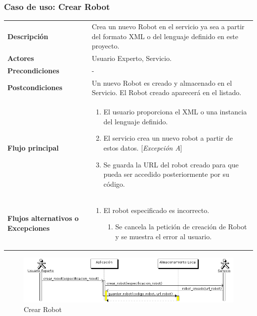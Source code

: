\subsubsection{\large{Caso de uso: Crear Robot}}

\begin{tabular}[h]{ p{ } p{ }}

\textbf{Descripción} & Crea un nuevo Robot en el servicio ya sea a
partir del formato XML o del lenguaje definido en este
proyecto.\\[3mm]

\textbf{Actores} & Usuario Experto, Servicio.\\[3mm]

\textbf{Precondiciones} & - \\[3mm]

\textbf{Postcondiciones} & Un nuevo Robot es creado y almacenado en el
Servicio. El Robot creado aparecerá en el listado.\\[3mm]

\textbf{Flujo principal} & \begin{enumerate}[leftmargin=1em,topsep=0pt, partopsep=0pt]
  \item El usuario proporciona el XML o una instancia del lenguaje
    definido.
  \item El servicio crea un nuevo robot a partir de estos
    datos. [\emph{Excepción A}]
  \item Se guarda la URL del robot creado para que pueda ser accedido
    posteriormente por su código.
\end{enumerate}\\[3mm]

\textbf{Flujos alternativos o Excepciones} &
\begin{enumerate}[label=\Alph*:,leftmargin=1em,topsep=0pt, partopsep=0pt]
\item El robot especificado es incorrecto.
  \begin{enumerate}[label=\arabic*.,topsep=0pt, partopsep=0pt]
    \item Se cancela la petición de creación de Robot y se muestra el
      error al usuario.
  \end{enumerate}
\end{enumerate}\\[3mm]
\end{tabular}

\begin{figure}[bp!]
  \includegraphics[width=1\textwidth]{chapters/technical-manual/diagrams/sequence/expert_user/crear_robot.png}
\caption{Crear Robot}
\end{figure}
\clearpage
